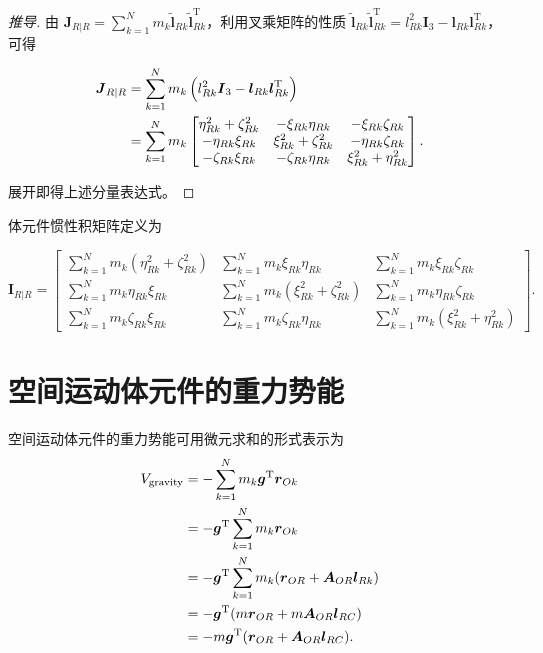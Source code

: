 \begin{proof}[推导]
由 $\boldsymbol{J}_{R|R} = \sum_{k=1}^{N} m_k \tilde{\boldsymbol{l}}_{Rk} \tilde{\boldsymbol{l}}_{Rk}^{\mathrm{T}}$，利用叉乘矩阵的性质 $\tilde{\boldsymbol{l}}_{Rk} \tilde{\boldsymbol{l}}_{Rk}^{\mathrm{T}} = l_{Rk}^2 \boldsymbol{I}_3 - \boldsymbol{l}_{Rk} \boldsymbol{l}_{Rk}^{\mathrm{T}}$，可得

\begin{align*}\boldsymbol{J}_{R|R} &= \sum_{k=1}^{N} m_k \left( l_{Rk}^2 \boldsymbol{I}_3 - \boldsymbol{l}_{Rk} \boldsymbol{l}_{Rk}^{\mathrm{T}} \right) \notag \\
&= \sum_{k=1}^{N} m_k \begin{bmatrix} \eta_{Rk}^2 + \zeta_{Rk}^2 & -\xi_{Rk} \eta_{Rk} & -\xi_{Rk} \zeta_{Rk} \\ -\eta_{Rk} \xi_{Rk} & \xi_{Rk}^2 + \zeta_{Rk}^2 & -\eta_{Rk} \zeta_{Rk} \\ -\zeta_{Rk} \xi_{Rk} & -\zeta_{Rk} \eta_{Rk} & \xi_{Rk}^2 + \eta_{Rk}^2 \end{bmatrix}.\end{align*}

展开即得上述分量表达式。
\end{proof}
\begin{definition}[定义 8.4（惯性积矩阵）]
体元件惯性积矩阵定义为

\[
\boldsymbol{I}_{R|R} = \begin{bmatrix} \sum_{k=1}^{N} m_k (\eta_{Rk}^2 + \zeta_{Rk}^2) & \sum_{k=1}^{N} m_k \xi_{Rk} \eta_{Rk} & \sum_{k=1}^{N} m_k \xi_{Rk} \zeta_{Rk} \\ \sum_{k=1}^{N} m_k \eta_{Rk} \xi_{Rk} & \sum_{k=1}^{N} m_k (\xi_{Rk}^2 + \zeta_{Rk}^2) & \sum_{k=1}^{N} m_k \eta_{Rk} \zeta_{Rk} \\ \sum_{k=1}^{N} m_k \zeta_{Rk} \xi_{Rk} & \sum_{k=1}^{N} m_k \zeta_{Rk} \eta_{Rk} & \sum_{k=1}^{N} m_k (\xi_{Rk}^2 + \eta_{Rk}^2) \end{bmatrix}.
\]
\end{definition}
\section{空间运动体元件的重力势能}
空间运动体元件的重力势能可用微元求和的形式表示为
\begin{align*}V_{\text{gravity}} &= -\sum_{k=1}^{N} m_k \boldsymbol{g}^{\mathrm{T}} \boldsymbol{r}_{Ok} \notag \\
&= -\boldsymbol{g}^{\mathrm{T}} \sum_{k=1}^{N} m_k \boldsymbol{r}_{Ok} \notag \\
&= -\boldsymbol{g}^{\mathrm{T}} \sum_{k=1}^{N} m_k (\boldsymbol{r}_{OR} + \boldsymbol{A}_{OR} \boldsymbol{l}_{Rk}) \notag \\
&= -\boldsymbol{g}^{\mathrm{T}} (m \boldsymbol{r}_{OR} + m \boldsymbol{A}_{OR} \boldsymbol{l}_{RC}) \notag \\
&= -m \boldsymbol{g}^{\mathrm{T}} (\boldsymbol{r}_{OR} + \boldsymbol{A}_{OR} \boldsymbol{l}_{RC}).\end{align*}
